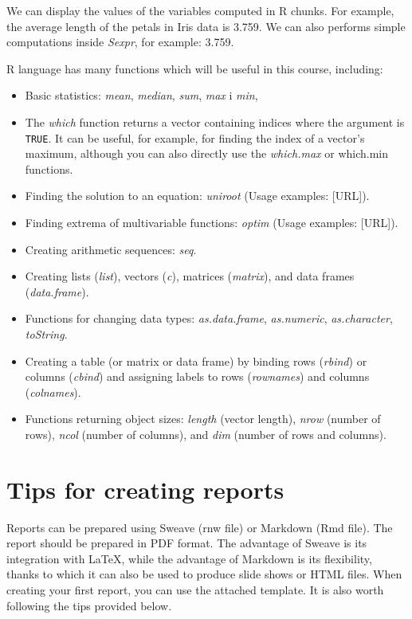 \documentclass[12pt, a4paper]{article}\usepackage[]{graphicx}\usepackage[]{xcolor}
\begin{document}
We can display the values of the variables computed in R chunks. For example, the average length of the petals in Iris data is 3.759. We can also performs simple computations inside \textit{Sexpr}, for example: 3.759.

R language has many functions which will be useful in this course, including:
\begin{itemize}
\item Basic statistics: \textit{mean}, \textit{median}, \textit{sum}, \textit{max} i \textit{min},
\item The \textit{which} function returns a vector containing indices where the argument is \texttt{TRUE}. It can be useful, for example, for finding the index of a vector's maximum, although you can also directly use the \textit{which.max} or which.min functions.
\item Finding the solution to an equation: \textit{uniroot} (Usage examples: [URL]).
\item Finding extrema of multivariable functions: \textit{optim} (Usage examples: [URL]).
\item Creating arithmetic sequences: \textit{seq}.
\item Creating lists (\textit{list}), vectors (\textit{c}), matrices (\textit{matrix}), and data frames (\textit{data.frame}).
\item Functions for changing data types: \textit{as.data.frame}, \textit{as.numeric}, \textit{as.character}, \textit{toString}.
\item Creating a table (or matrix or data frame) by binding rows (\textit{rbind}) or columns (\textit{cbind}) and assigning labels to rows (\textit{rownames}) and columns (\textit{colnames}).
\item Functions returning object sizes: \textit{length} (vector length), \textit{nrow} (number of rows), \textit{ncol} (number of columns), and \textit{dim} (number of rows and columns).
\end{itemize}

\section{Tips for creating reports}
Reports can be prepared using Sweave (rnw file) or Markdown (Rmd file). The report should be prepared in PDF format. The advantage of Sweave is its integration with \LaTeX, while the advantage of Markdown is its flexibility, thanks to which it can also be used to produce slide shows or HTML files. When creating your first report, you can use the attached template. It is also worth following the tips provided below.
\end{document}
